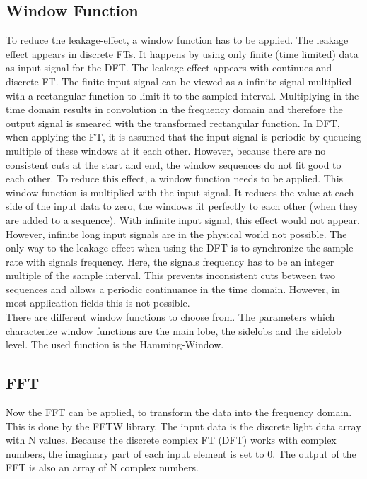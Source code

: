 \documentclass[notitlepage]{scrreprt}
\begin{document}
\subsection{Window Function}
To reduce the leakage-effect, a window function has to be applied. The leakage effect appears in discrete FTs. It happens by using only finite (time limited) data as input signal for the DFT. The leakage effect appears with continues and discrete FT. The finite input signal can be viewed as a infinite signal multiplied with a rectangular function to limit it to the sampled interval. Multiplying in the time domain results in convolution in the frequency domain and therefore the output signal is smeared with the transformed rectangular function. In DFT, when applying the FT, it is assumed that the input signal is periodic by queueing multiple of these windows at it each other. However, because there are no consistent cuts at the start and end, the window sequences do not fit good to each other. To reduce this effect, a window function needs to be applied. This window function is multiplied with the input signal. It reduces the value at each side of the input data to zero, the windows fit perfectly to each other (when they are added to a sequence). With infinite input signal, this effect would not appear. However, infinite long input signals are in the physical world not possible. The only way to the leakage effect when using the DFT is to synchronize the sample rate with signals frequency. Here, the signals frequency has to be an integer multiple of the sample interval. This prevents inconsistent cuts between two sequences and allows a periodic continuance in the time domain. However, in most application fields this is not possible.\\

There are different window functions to choose from. The parameters which characterize window functions are the main lobe, the sidelobs and the sidelob level. The used function is the Hamming-Window. 

\subsection{FFT}
Now the FFT can be applied, to transform the data into the frequency domain. This is done by the FFTW library. The input data is the discrete light data array with N values. Because the discrete complex FT (DFT) works with complex numbers, the imaginary part of each input element is set to 0. The output of the FFT is also an array of N complex numbers.
\end{document}
